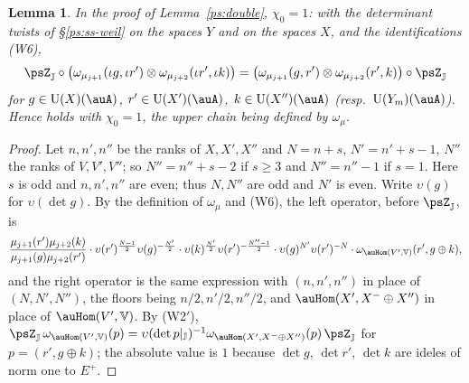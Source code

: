 \documentclass[10pt]{amsart}
\newtheorem{lemma}[theorem]{Lemma}
\theoremstyle{definition}
\theoremstyle{remark}
\providecommand{\auU}{\mathrm U}
\begin{document}
\begin{lemma}\label{pk:chi0}
In the proof of Lemma~\ref{ps:double}, $\chi_0=1$: with the determinant twists of
\S\ref{ps:ss-weil} on the spaces $Y$ and on the spaces $X$, and the identifications {\rm(W6)},
\[
\psZ_{\mathbb J}\circ\bigl(\omega_{\mu_{j+1}}(\iota g,\iota r')\otimes\omega_{\mu_{j+2}}(\iota r',
\iota k)\bigr)=\bigl(\omega_{\mu_{j+1}}(g,r')\otimes\omega_{\mu_{j+2}}(r',k)\bigr)\circ\psZ_{\mathbb J}
\]
for $g\in\auU(X)(\auA)$, $r'\in\auU(X')(\auA)$, $k\in\auU(X'')(\auA)$ (resp.\ $\auU(Y_m)(\auA)$).
Hence {\cite[Proposition~14.19]{P46}} holds with $\chi_0=1$, the upper chain being defined by $\omega_\mu$.
\end{lemma}
\begin{proof}
Let $n,n',n''$ be the ranks of $X,X',X''$ and $N=n+s$, $N'=n'+s-1$, $N''$ the ranks of
$V,V',V''$; so $N''=n''+s-2$ if $s\ge3$ and $N''=n''-1$ if $s=1$. Here $s$ is odd and
$n,n',n''$ are even; thus $N,N''$ are odd and $N'$ is even. Write $\upsilon(g)$ for
$\upsilon(\det g)$. By the definition of $\omega_\mu$ and (W6), the left operator, before
$\psZ_{\mathbb J}$, is
\[
\frac{\mu_{j+1}(r')\mu_{j+2}(k)}{\mu_{j+1}(g)\mu_{j+2}(r')}\cdot\upsilon(r')^{\frac{N-1}2}\upsilon(g)^{-
\frac{N'}2}\cdot\upsilon(k)^{\frac{N'}2}\upsilon(r')^{-\frac{N''-1}2}\cdot\upsilon(g)^{N'}\upsilon(r')^{-N}
\cdot\omega_{\auHom(V',\mathbb V)}(r',g\oplus k),
\]
and the right operator is the same expression with $(n,n',n'')$ in place of $(N,N',N'')$, the
floors being $n/2,n'/2,n''/2$, and $\auHom(X',X^-\oplus X'')$ in place of $\auHom(V',\mathbb V)$.
By (W2$'$), $\psZ_{\mathbb J}\,\omega_{\auHom(V',\mathbb V)}(p)=\upsilon(\det p|_{\mathbb J})^{-1}
\omega_{\auHom(X',X^-\oplus X'')}(p)\,\psZ_{\mathbb J}$ for $p=(r',g\oplus k)$; the absolute value
is $1$ because $\det g$, $\det r'$, $\det k$ are ideles of norm one to $E^+$.


\end{proof}
\end{document}
